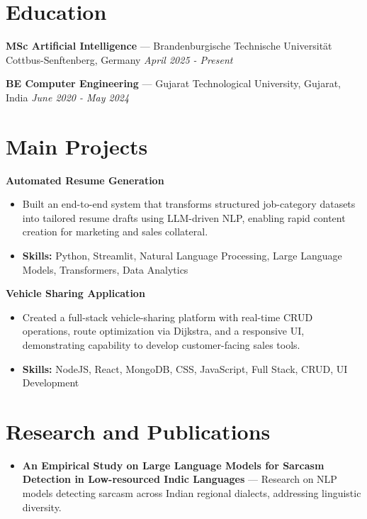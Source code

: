 \documentclass[a4paper,10pt]{article}
\begin{document}
\section*{Education}
\textbf{MSc Artificial Intelligence} — Brandenburgische Technische Universität Cottbus-Senftenberg, Germany \hfill \textit{April 2025 - Present}\par
\vspace{1.5pt}
\textbf{BE Computer Engineering} — Gujarat Technological University, Gujarat, India \hfill \textit{June 2020 - May 2024}\par

\section*{Main Projects}
\textbf{Automated Resume Generation}\par
\vspace{1pt}
\begin{itemize}
  \item Built an end-to-end system that transforms structured job-category datasets into tailored resume drafts using LLM-driven NLP, enabling rapid content creation for marketing and sales collateral.
  \item \textbf{Skills:} Python, Streamlit, Natural Language Processing, Large Language Models, Transformers, Data Analytics
\end{itemize}
\vspace{3pt}
\textbf{Vehicle Sharing Application}\par
\vspace{1pt}
\begin{itemize}
  \item Created a full-stack vehicle-sharing platform with real-time CRUD operations, route optimization via Dijkstra, and a responsive UI, demonstrating capability to develop customer-facing sales tools.
  \item \textbf{Skills:} NodeJS, React, MongoDB, CSS, JavaScript, Full Stack, CRUD, UI Development
\end{itemize}

\section*{Research and Publications}
\begin{itemize}
\item \textbf{An Empirical Study on Large Language Models for Sarcasm Detection in Low-resourced Indic Languages} — Research on NLP models detecting sarcasm across Indian regional dialects, addressing linguistic diversity.
\end{itemize}
\end{document}
